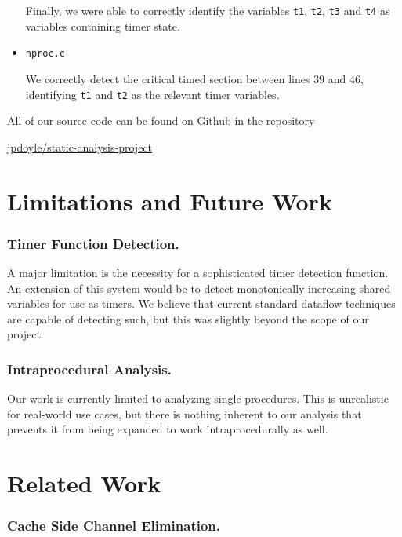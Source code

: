 \documentclass[12pt]{article}
\begin{document}
\begin{multicols*}{2}
\begin{itemize}
      Finally, we were able to correctly identify the variables \texttt{t1},
      \texttt{t2}, \texttt{t3} and \texttt{t4} as variables containing timer
      state.

    \item \texttt{nproc.c}

      We correctly detect the critical timed section between lines 39 and 46,
      identifying \texttt{t1} and \texttt{t2} as the relevant timer variables.
  \end{itemize}

  All of our source code can be found on Github in the repository

  \href{https://github.com/jpdoyle/static-analysis-project}{jpdoyle/static-analysis-project}

  \section{Limitations and Future Work}

  \subsubsection*{Timer Function Detection.}

  A major limitation is the necessity for a sophisticated timer detection
  function. An extension of this system would be to detect monotonically
  increasing shared variables for use as timers. We believe that current
  standard dataflow techniques are capable of detecting such, but this was
  slightly beyond the scope of our project.

  \subsubsection*{Intraprocedural Analysis.}

  Our work is currently limited to analyzing single procedures. This is
  unrealistic for real-world use cases, but there is nothing inherent to our
  analysis that prevents it from being expanded to work intraprocedurally as
  well.

  \section{Related Work}

  \subsubsection*{Cache Side Channel Elimination.}


\end{multicols*}
\end{document}
